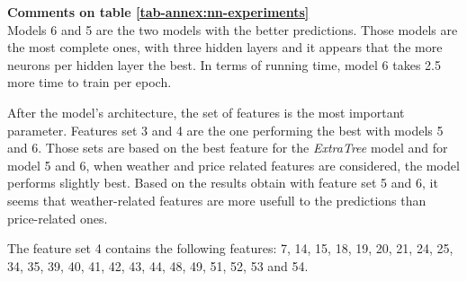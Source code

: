 \noindent\textbf{Comments on table \ref{tab-annex:nn-experiments}}\\
\indent Models 6 and 5 are the two models with the better predictions. Those models are the most complete ones, with three hidden layers and it appears that the more neurons per hidden layer the best. In terms of running time, model 6 takes 2.5 more time to train per epoch.

After the model's architecture, the set of features is the most important parameter. Features set 3 and 4 are the one performing the best with models 5 and 6. Those sets are based on the best feature for the \textit{ExtraTree} model and for model 5 and 6, when weather and price related features are considered, the model performs slightly best. Based on the results obtain with feature set 5 and 6, it seems that weather-related features are more usefull to the predictions than price-related ones.

The feature set 4 contains the following features: 7, 14, 15, 18, 19, 20, 21, 24, 25, 34, 35, 39, 40, 41, 42, 43, 44, 48, 49, 51, 52, 53 and 54.


